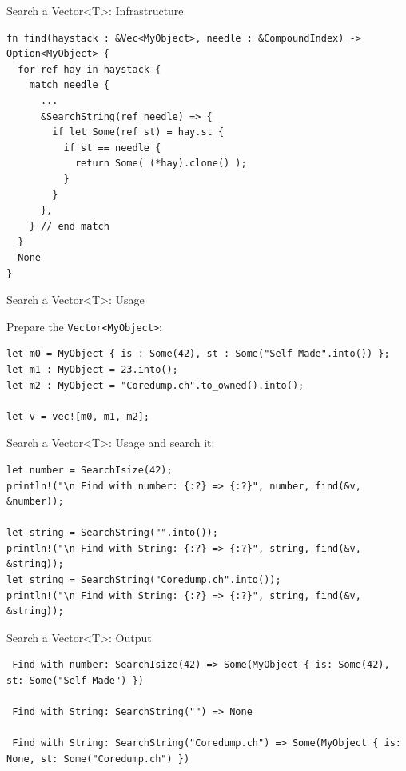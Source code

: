 \documentclass[aspectratio=1610,t]{beamer}
\begin{document}
\begin{frame}[fragile]{Search a Vector<T>: Infrastructure}
\begin{verbatim}
fn find(haystack : &Vec<MyObject>, needle : &CompoundIndex) -> Option<MyObject> {
  for ref hay in haystack {
    match needle {
      ...
      &SearchString(ref needle) => {
        if let Some(ref st) = hay.st {
          if st == needle {
            return Some( (*hay).clone() );
          }
        }
      },
    } // end match
  }
  None
}
\end{verbatim}
\end{frame}



\begin{frame}[fragile]{Search a Vector<T>: Usage}

Prepare the \texttt{Vector<MyObject>}:
\begin{verbatim}
let m0 = MyObject { is : Some(42), st : Some("Self Made".into()) };
let m1 : MyObject = 23.into();
let m2 : MyObject = "Coredump.ch".to_owned().into();

let v = vec![m0, m1, m2];
\end{verbatim}
\end{frame}


\begin{frame}[fragile]{Search a Vector<T>: Usage}
and search it:
\begin{verbatim}
let number = SearchIsize(42);
println!("\n Find with number: {:?} => {:?}", number, find(&v, &number));

let string = SearchString("".into());
println!("\n Find with String: {:?} => {:?}", string, find(&v, &string));
let string = SearchString("Coredump.ch".into());
println!("\n Find with String: {:?} => {:?}", string, find(&v, &string));
\end{verbatim}
\end{frame}

\begin{frame}[fragile]{Search a Vector<T>: Output}
\begin{verbatim}
 Find with number: SearchIsize(42) => Some(MyObject { is: Some(42), st: Some("Self Made") })

 Find with String: SearchString("") => None

 Find with String: SearchString("Coredump.ch") => Some(MyObject { is: None, st: Some("Coredump.ch") })
\end{verbatim}
\end{frame}
\end{document}
